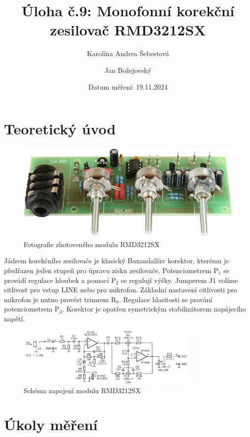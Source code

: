 \documentclass[a4paper, czech]{article}
\title{Úloha č.9: Monofonní korekční zesilovač RMD3212SX}
\author{Karolína Andrea Šebestová \and Jan Božejovský}
\date{Datum měření: 19.11.2024}
\begin{document}
\maketitle

\section{Teoretický úvod}

\begin{figure}[H]
    \centering
    \includegraphics[]{zesilovac_foto.jpg}
    \caption{Fotografie zhotoveného modulu RMD3212SX}
\end{figure}

Jádrem korekčního zesilovače je klasický Baxandallův korektor, kterému je předřazen
jeden stupeň pro úpravu zisku zesilovače.
Potenciometrem $\text{P}_1$ se provádí regulace hloubek a pomocí $\text{P}_2$ se
regulují výšky.
Jumperem J1 volíme citlivost pro vstup LINE nebo pro mikrofon.
Základní nastavení citlivosti pro mikrofon je nutno provést trimrem $\text{R}_8$.
Regulace hlasitosti se prování potenciometrem $\text{P}_3$.
Korektor je opatřen symetrickým stabilizátorem napájecího napětí.

\begin{figure}[H]
    \centering
    \includegraphics[width=0.8\textwidth]{zesilovac_schema.png}
    \caption{Schéma zapojení modulu RMD3212SX}
\end{figure}

\section{Úkoly měření}
\end{document}

